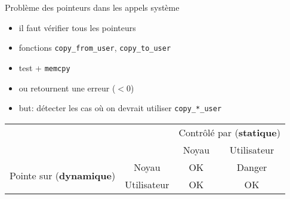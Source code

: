 \begin{frame}{Problème des pointeurs dans les appels système}



\begin{itemize}
    \item il faut vérifier tous les pointeurs
    \item fonctions \texttt{copy\_from\_user}, \texttt{copy\_to\_user}
    \item test + \texttt{memcpy}
    \item ou retournent une erreur ($< 0$)
    \item but: détecter les cas où on devrait utiliser \texttt{copy\_*\_user}
\end{itemize}

\begin{center}
\begin{tabular}{cccc}
    \toprule
    & & \multicolumn{2}{p{2cm}}{Contrôlé par \newline (\textbf{statique})} \\
    & & Noyau & Utilisateur \\
    \midrule
\multirow{2}{*}{\parbox{2cm}{Pointe sur \newline (\textbf{dynamique})}}
    & Noyau  & OK & Danger \\
    & Utilisateur & OK & OK \\
    \bottomrule
\end{tabular}
\end{center}

\end{frame}



